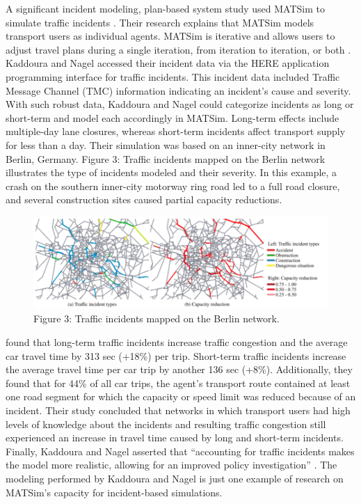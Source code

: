 \documentclass[
  letterpaper,
  authoryear]{elsarticle}
\begin{document}
A significant incident modeling, plan-based system study used MATSim to
simulate traffic incidents \citep{kaddoura2018}. Their research explains
that MATSim models transport users as individual agents. MATSim is
iterative and allows users to adjust travel plans during a single
iteration, from iteration to iteration, or both \citep{kaddoura2018}.
Kaddoura and Nagel accessed their incident data via the HERE application
programming interface for traffic incidents. This incident data included
Traffic Message Channel (TMC) information indicating an incident's cause
and severity. With such robust data, Kaddoura and Nagel could categorize
incidents as long or short-term and model each accordingly in MATSim.
Long-term effects include multiple-day lane closures, whereas short-term
incidents affect transport supply for less than a day. Their simulation
was based on an inner-city network in Berlin, Germany. Figure 3: Traffic
incidents mapped on the Berlin network illustrates the type of incidents
modeled and their severity. In this example, a crash on the southern
inner-city motorway ring road led to a full road closure, and several
construction sites caused partial capacity reductions.

\begin{figure}

{\centering \includegraphics{figures/fig3.png}

}

\caption{Figure 3: Traffic incidents mapped on the Berlin network.}

\end{figure}

\citet{kaddoura2018} found that long-term traffic incidents increase
traffic congestion and the average car travel time by 313 sec (+18\%)
per trip. Short-term traffic incidents increase the average travel time
per car trip by another 136 sec (+8\%). Additionally, they found that
for 44\% of all car trips, the agent's transport route contained at
least one road segment for which the capacity or speed limit was reduced
because of an incident. Their study concluded that networks in which
transport users had high levels of knowledge about the incidents and
resulting traffic congestion still experienced an increase in travel
time caused by long and short-term incidents. Finally, Kaddoura and
Nagel asserted that ``accounting for traffic incidents makes the model
more realistic, allowing for an improved policy investigation'' \citep[
p.885]{kaddoura2018}. The modeling performed by Kaddoura and Nagel is
just one example of research on MATSim's capacity for incident-based
simulations.
\end{document}

